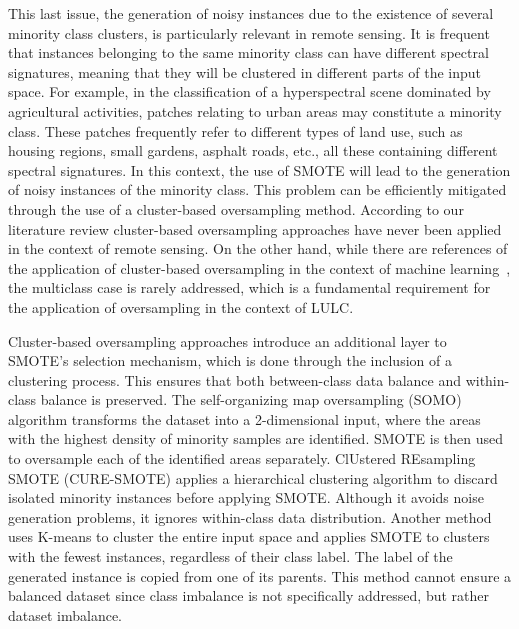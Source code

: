 This last issue, the generation of noisy instances due to the existence of
several minority class clusters, is particularly relevant in remote sensing.
It is frequent that instances belonging to the same minority class can have
different spectral signatures, meaning that they will be clustered in
different parts of the input space. For example, in the classification of a
hyperspectral scene dominated by agricultural activities, patches relating to
urban areas may constitute a minority class. These patches frequently refer to
different types of land use, such as housing regions, small gardens, asphalt
roads, etc., all these containing different spectral signatures. In this
context, the use of SMOTE will lead to the generation of noisy instances of
the minority class. This problem can be efficiently mitigated through the use
of a cluster-based oversampling method. According to our literature review
cluster-based oversampling approaches have never been applied in the context
of remote sensing. On the other hand, while there are references of the
application of cluster-based oversampling in the context of machine
learning~\cite{Santos2015, Douzas2017, Ma2017, Douzas2018}, the multiclass
case is rarely addressed, which is a fundamental requirement for the
application of oversampling in the context of LULC. 

Cluster-based oversampling approaches introduce an additional layer to SMOTE's
selection mechanism, which is done through the inclusion of a clustering
process. This ensures that both between-class data balance and
within-class balance is preserved. The
self-organizing map oversampling (SOMO) \cite{Douzas2017} algorithm transforms
the dataset into a 2-dimensional input, where the areas with the highest
density of minority samples are identified. SMOTE is then used to oversample
each of the identified areas separately. ClUstered REsampling SMOTE
(CURE-SMOTE) \cite{Ma2017} applies a hierarchical clustering
algorithm to discard isolated minority instances before applying SMOTE.
Although it avoids noise generation problems, it ignores within-class data
distribution. Another method \cite{Santos2015} uses K-means to cluster the
entire input space and applies SMOTE to clusters with the fewest
instances, regardless of their class label. The label of the
generated instance is copied from one of its parents.
This method cannot ensure a balanced dataset since class imbalance is not
specifically addressed, but rather dataset imbalance.

